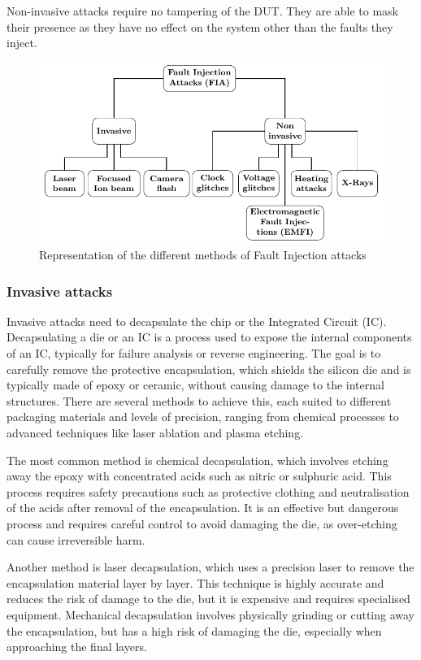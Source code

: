 Non-invasive attacks require no tampering of the DUT. They are able to mask their presence as they have no effect on the system other than the faults they inject.

\begin{figure}[ht]
    \centering
    \includegraphics[page=2, width=.75\textwidth]{c2_soa/img/physicalAttacks.pdf}
    \caption{Representation of the different methods of Fault Injection attacks}
    \label{fig:fia}
\end{figure}

\subsubsection{Invasive attacks}
\label{subsubsection:invasiveAttacks}
Invasive attacks need to decapsulate the chip or the Integrated Circuit (IC).
Decapsulating a die or an IC is a process used to expose the internal components of an IC, typically for failure analysis or reverse engineering. The goal is to carefully remove the protective encapsulation, which shields the silicon die and is typically made of epoxy or ceramic, without causing damage to the internal structures. There are several methods to achieve this, each suited to different packaging materials and levels of precision, ranging from chemical processes to advanced techniques like laser ablation and plasma etching.

The most common method is chemical decapsulation, which involves etching away the epoxy with concentrated acids such as nitric or sulphuric acid. This process requires safety precautions such as protective clothing and neutralisation of the acids after removal of the encapsulation. It is an effective but dangerous process and requires careful control to avoid damaging the die, as over-etching can cause irreversible harm.

Another method is laser decapsulation, which uses a precision laser to remove the encapsulation material layer by layer. This technique is highly accurate and reduces the risk of damage to the die, but it is expensive and requires specialised equipment. Mechanical decapsulation involves physically grinding or cutting away the encapsulation, but has a high risk of damaging the die, especially when approaching the final layers.

